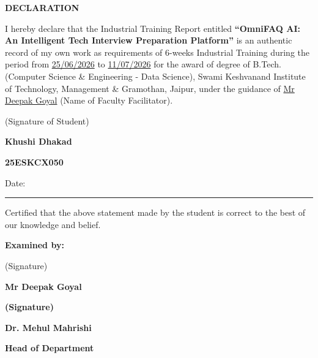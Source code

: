 \begin{center}

{\fontsize{16}{20}\selectfont\bfseries
DECLARATION}

\end{center}

\vspace{1cm}

\justifying
\noindent
I hereby declare that the Industrial Training Report entitled
\textbf{``OmniFAQ AI: An Intelligent Tech Interview Preparation Platform''}
is an authentic record of my own work as requirements of 6-weeks Industrial Training during the period from
\underline{25/06/2026}
to
\underline{11/07/2026}
for the award of degree of B.Tech. (Computer Science \& Engineering - Data Science),
Swami Keshvanand Institute of Technology, Management \& Gramothan,
Jaipur, under the guidance of
\underline{Mr Deepak Goyal}
(Name of Faculty Facilitator).

\vspace{1.3cm}

\begin{flushright}
(Signature of Student)

\vspace{0.4cm}

\textbf{Khushi Dhakad}

\vspace{0.4cm}

\textbf{25ESKCX050}

\vspace{0.5cm}

\end{flushright}
Date:\rule{4cm}{0.4pt}

\vspace{1cm}
\noindent
Certified that the above statement made by the student is correct
to the best of our knowledge and belief.

\vspace{1.2cm}
\noindent
\textbf{Examined by:}

\vspace{0.8cm}

\noindent
\begin{minipage}[t]{0.45\textwidth}

(Signature)

\vspace{0.8cm}

\textbf{Mr Deepak Goyal}

\end{minipage}
\hfill
\begin{minipage}[t]{0.35\textwidth}

\vspace{2.3cm} %

\textbf{(Signature)}

\vspace{0.8cm}

\textbf{Dr. Mehul Mahrishi}

\textbf{Head of Department}

\end{minipage}
